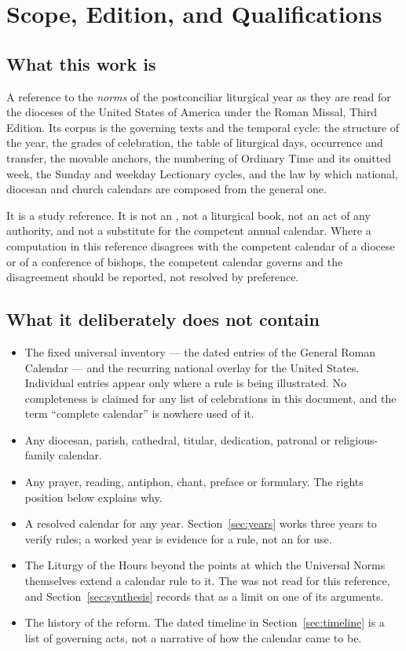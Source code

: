\section{Scope, Edition, and Qualifications}

\subsection{What this work is}

A reference to the \emph{norms} of the postconciliar liturgical year as they are read for the
dioceses of the United States of America under the Roman Missal, Third Edition. Its corpus is the
governing texts and the temporal cycle: the structure of the year, the grades of celebration, the
table of liturgical days, occurrence and transfer, the movable anchors, the numbering of Ordinary
Time and its omitted week, the Sunday and weekday Lectionary cycles, and the law by which national,
diocesan and church calendars are composed from the general one.

It is a study reference. It is not an , not a liturgical book, not an act of any
authority, and not a substitute for the competent annual calendar. Where a computation in this
reference disagrees with the competent calendar of a diocese or of a conference of bishops, the
competent calendar governs and the disagreement should be reported, not resolved by preference.

\subsection{What it deliberately does not contain}

\begin{itemize}
\item The fixed universal inventory --- the dated entries of the General Roman Calendar --- and the
recurring national overlay for the United States. Individual entries appear only where a rule is
being illustrated. No completeness is claimed for any list of celebrations in this document, and the
term ``complete calendar'' is nowhere used of it.
\item Any diocesan, parish, cathedral, titular, dedication, patronal or religious-family calendar.
\item Any prayer, reading, antiphon, chant, preface or formulary. The rights position below explains
why.
\item A resolved calendar for any year. Section~\ref{sec:years} works three years to verify rules; a
worked year is evidence for a rule, not an  for use.
\item The Liturgy of the Hours beyond the points at which the Universal Norms themselves extend a
calendar rule to it. The  was not read for this
reference, and Section~\ref{sec:synthesis} records that as a limit on one of its arguments.
\item The history of the reform. The dated timeline in Section~\ref{sec:timeline} is a list of governing acts, not a
narrative of how the calendar came to be.
\end{itemize}

